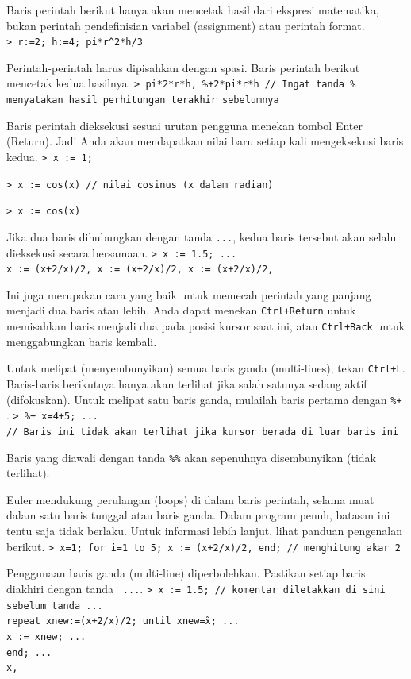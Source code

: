 \documentclass[11pt, a4paper]{article}
\newcommand{\emtcmd}[1]{\noindent\texttt{\textcolor{emtcommand}{>}\ #1}\par\smallskip}
\begin{document}
Baris perintah berikut hanya akan mencetak hasil dari ekspresi matematika, bukan perintah pendefinisian variabel (assignment) atau perintah format.
\emtcmd{r:=2; h:=4; pi*r\^{}2*h/3}

Perintah-perintah harus dipisahkan dengan spasi. Baris perintah berikut mencetak kedua hasilnya.
\emtcmd{pi*2*r*h, \%+2*pi*r*h \textcolor{emtcomment}{// Ingat tanda \% menyatakan hasil perhitungan terakhir sebelumnya}}

Baris perintah dieksekusi sesuai urutan pengguna menekan tombol Enter (Return). Jadi Anda akan mendapatkan nilai baru setiap kali mengeksekusi baris kedua.
\emtcmd{x := 1;}
\emtcmd{x := cos(x) \textcolor{emtcomment}{// nilai cosinus (x dalam radian)}}
\emtcmd{x := cos(x)}

Jika dua baris dihubungkan dengan tanda \texttt{...}, kedua baris tersebut akan selalu dieksekusi secara bersamaan.
\emtcmd{x := 1.5; ... \\
\hspace*{1em} x := (x+2/x)/2, x := (x+2/x)/2, x := (x+2/x)/2,}

Ini juga merupakan cara yang baik untuk memecah perintah yang panjang menjadi dua baris atau lebih. Anda dapat menekan \texttt{Ctrl+Return} untuk memisahkan baris menjadi dua pada posisi kursor saat ini, atau \texttt{Ctrl+Back} untuk menggabungkan baris kembali.

Untuk melipat (menyembunyikan) semua baris ganda (multi-lines), tekan \texttt{Ctrl+L}. Baris-baris berikutnya hanya akan terlihat jika salah satunya sedang aktif (difokuskan). Untuk melipat satu baris ganda, mulailah baris pertama dengan \texttt{\%+ }.
\emtcmd{\%+ x=4+5; ... \\
\hspace*{1em} \textcolor{emtcomment}{// Baris ini tidak akan terlihat jika kursor berada di luar baris ini}}

Baris yang diawali dengan tanda \texttt{\%\%} akan sepenuhnya disembunyikan (tidak terlihat).

Euler mendukung perulangan (loops) di dalam baris perintah, selama muat dalam satu baris tunggal atau baris ganda. Dalam program penuh, batasan ini tentu saja tidak berlaku. Untuk informasi lebih lanjut, lihat panduan pengenalan berikut.
\emtcmd{x=1; for i=1 to 5; x := (x+2/x)/2, end; \textcolor{emtcomment}{// menghitung akar 2}}

Penggunaan baris ganda (multi-line) diperbolehkan. Pastikan setiap baris diakhiri dengan tanda \texttt{ ...}.
\emtcmd{x := 1.5; \textcolor{emtcomment}{// komentar diletakkan di sini sebelum tanda ...} \\
\hspace*{1em} repeat xnew:=(x+2/x)/2; until xnew\~=x; ... \\
\hspace*{2em} x := xnew; ... \\
\hspace*{1em} end; ... \\
\hspace*{1em} x,}
\end{document}
